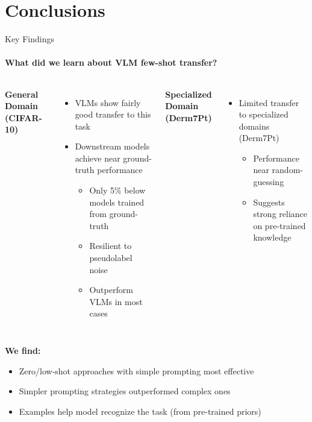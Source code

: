 \section{Conclusions}
\begin{frame}{Key Findings}
\framesubtitle{What did we learn about VLM few-shot transfer?}
  \vspace{-1em}
  \begin{columns}[T]
    \column{\customcolumnwidth}
      \textbf{General Domain (CIFAR-10)}
      \begin{itemize}
        \item VLMs show fairly good transfer to this task
        \item Downstream models achieve near ground-truth performance
        \begin{itemize}
          \item Only 5\% below models trained from ground-truth
          \item Resilient to pseudolabel noise
          \item Outperform VLMs in most cases
        \end{itemize}
      \end{itemize}
    \column{\customcolumnwidth}
      \textbf{Specialized Domain (Derm7Pt)}
      \begin{itemize}
        \item Limited transfer to specialized domains (Derm7Pt)
        \begin{itemize}
          \item Performance near random-guessing
          \item Suggests strong reliance on pre-trained knowledge
        \end{itemize}
      \end{itemize}
  \end{columns}
  \vspace{1em}
  \textbf{We find:}
  \begin{itemize}
    \item Zero/low-shot approaches with simple prompting most effective
    \item Simpler prompting strategies outperformed complex ones
    \item Examples help model recognize the task (from pre-trained priors)
  \end{itemize}
\end{frame}
